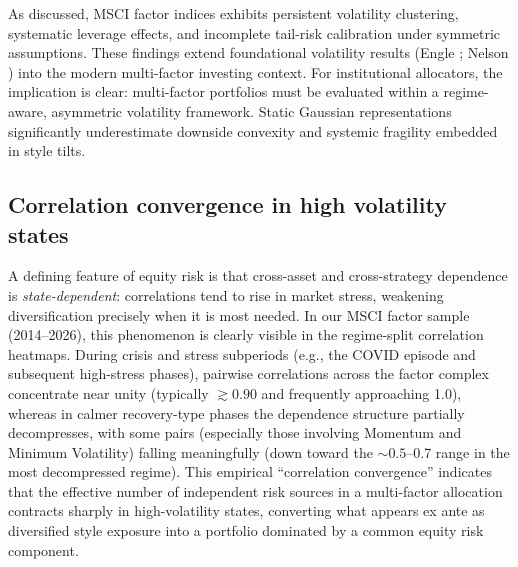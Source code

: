 \documentclass{article}
\begin{document}
As discussed, MSCI factor indices exhibits persistent volatility clustering, systematic leverage effects, and incomplete tail-risk calibration under symmetric assumptions. These findings extend foundational volatility results (Engle \cite{engle1982}; Nelson \cite{nelson1991}) into the modern multi-factor investing context. For institutional allocators, the implication is clear: multi-factor portfolios must be evaluated within a regime-aware, asymmetric volatility framework. Static Gaussian representations significantly underestimate downside convexity and systemic fragility embedded in style tilts.\newline

\subsection{Correlation convergence in high volatility states}

A defining feature of equity risk is that cross-asset and cross-strategy dependence is \emph{state-dependent}: correlations tend to rise in market stress, weakening diversification precisely when it is most needed. In our MSCI factor sample (2014--2026), this phenomenon is clearly visible in the regime-split correlation heatmaps. During crisis and stress subperiods (e.g., the COVID episode and subsequent high-stress phases), pairwise correlations across the factor complex concentrate near unity (typically $\gtrsim 0.90$ and frequently approaching 1.0), whereas in calmer recovery-type phases the dependence structure partially decompresses, with some pairs (especially those involving Momentum and Minimum Volatility) falling meaningfully (down toward the $\sim 0.5$--0.7 range in the most decompressed regime). This empirical ``correlation convergence'' indicates that the effective number of independent risk sources in a multi-factor allocation contracts sharply in high-volatility states, converting what appears ex ante as diversified style exposure into a portfolio dominated by a common equity risk component.\newline
\end{document}
